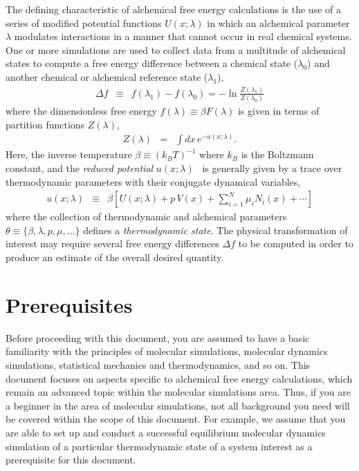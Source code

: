 \documentclass[9pt,bestpractices]{livecoms}
\begin{document}
The defining characteristic of alchemical free energy calculations is the use of a series of modified potential functions $U(x; \lambda)$ in which an alchemical parameter $\lambda$ modulates interactions in a manner that cannot occur in real chemical systems.
One or more simulations are used to collect data from a multitude of alchemical states to compute a free energy difference between a chemical state ($\lambda_0$) and another chemical or alchemical reference state ($\lambda_1$),
\begin{eqnarray}
\Delta f &\equiv& f(\lambda_1) - f(\lambda_0) = - \ln \frac{Z(\lambda_1)}{Z(\lambda_0)}
\end{eqnarray}
where the dimensionless free energy $f(\lambda) \equiv \beta F(\lambda)$ is given in terms of partition functions $Z(\lambda)$,
\begin{eqnarray}
Z(\lambda) &=& \int dx \, e^{-u(x; \lambda)} .
\end{eqnarray}
Here, the inverse temperature $\beta \equiv (k_B T)^{-1}$ where $k_B$ is the Boltzmann constant, and the \emph{reduced potential} $u(x; \lambda)$~\cite{reduced-potential} is generally given by a trace over thermodynamic parameters with their conjugate dynamical variables,
\begin{eqnarray}
u(x;\lambda) &\equiv& \beta \left[ U(x;\lambda) + p \, V(x) + \sum_{i=1}^N \mu_i N_i(x) + \cdots \right]
\end{eqnarray}
where the collection of thermodynamic and alchemical parameters $\theta \equiv \{\beta, \lambda, p, \mu, \ldots\}$ defines a \emph{thermodynamic state}.
The physical transformation of interest may require several free energy differences $\Delta f$ to be computed in order to produce an estimate of the overall desired quantity.

\section{Prerequisites}
\label{sec:pre}

Before proceeding with this document, you are assumed to have a basic familiarity with the principles of molecular simulations, molecular dynamics simulations, statistical mechanics and thermodynamics, and so on.
This document focuses on aspects specific to alchemical free energy calculations, which remain an advanced topic within the molecular simulations area.
Thus, if you are a beginner in the area of molecular simulations, not all background you need will be covered within the scope of this document.
For example, we assume that you are able to set up and conduct a successful equilibrium molecular dynamics simulation of a particular thermodynamic state of a system interest as a prerequisite for this document.
\end{document}

